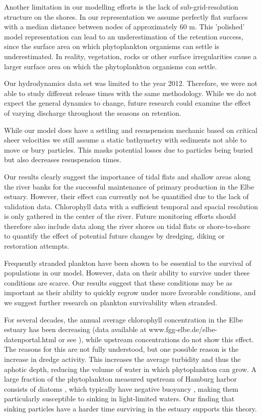 \documentclass[npg, manuscript]{copernicus}
\begin{document}
Another limitation in our modelling efforts is the lack of sub-grid-resolution structure on the shores.
In our representation we assume perfectly flat surfaces with a median distance between nodes of approximately 60 \unit{m}. 
This 'polished' model representation can lead to an underestimation of the retention success, since the surface area on which phytoplankton organisms can settle is underestimated.
In reality, vegetation, rocks or other surface irregularities cause a larger surface area on which the phytoplankton organisms can settle.

Our hydrodynamics data set was limited to the year 2012.
Therefore, we were not able to study different release times with the same methodology.
While we do not expect the general dynamics to change, future research could examine the effect of varying discharge throughout the seasons on retention.

While our model does have a settling and resuspension mechanic based on critical sheer velocities we still assume a static bathymetry with sediments not able to move or bury particles. 
This masks potential losses due to particles being buried but also decreases resuspension times.

\medskip

Our results clearly suggest the importance of tidal flats and shallow areas along the river banks for the successful maintenance of primary production in the Elbe estuary. 
However, their effect can currently not be quantified due to the lack of validation data.
Chlorophyll data with a sufficient temporal and spacial resolution is only gathered in the center of the river.
Future monitoring efforts should therefore also include data along the river shores on tidal flats or shore-to-shore to quantify the effect of potential future changes by dredging, diking or restoration attempts.

Frequently stranded plankton have been shown to be essential to the survival of populations in our model.
However, data on their ability to survive under these conditions are scarce.
Our results suggest that these conditions may be as important as their ability to quickly regrow under more favorable conditions, and we suggest further research on plankton survivability when stranded.

For several decades, the annual average chlorophyll concentration in the Elbe estuary has been decreasing (data available at www.fgg-elbe.de/elbe-datenportal.html or see \citep{Hardenbicker2014,Schol2014}), while upstream concentrations do not show this effect.
The reasons for this are not fully understood, but one possible reason is the increase in dredge activity.
This increases the average turbidity and thus the aphotic depth, reducing the volume of water in which phytoplankton can grow.
A large fraction of the phytoplankton measured upstream of Hamburg harbor consists of diatoms \citep{Muylaert1999}, which typically have negative buoyancy \citep{Passow1991}, making them particularly susceptible to sinking in light-limited waters.
Our finding that sinking particles have a harder time surviving in the estuary supports this theory.
\end{document}
